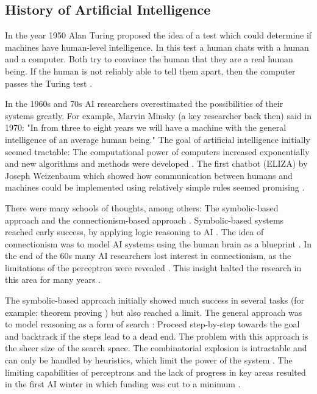 \documentclass[draft,final,oneside]{vutinfth} %
\begin{document}
\subsection{History of Artificial Intelligence}

In the year 1950 Alan Turing proposed the idea of a test which could determine if machines have human-level intelligence. In this test a human chats with a human and a computer. Both try to convince the human that they are a real human being. If the human is not reliably able to tell them apart, then the computer passes the Turing test \cite{turingtest}.

In the 1960s and 70s AI researchers overestimated the possibilities of their systems greatly. For example, Marvin Minsky (a key researcher back then) said in 1970: "In from three to eight years we will have a machine with the general intelligence of an average human being." The goal of artificial intelligence initially seemed tractable:
The computational power of computers increased exponentially and new algorithms and methods were developed \cite{mooreslaw}\cite{questforai}. The first chatbot (ELIZA) by Joseph Weizenbaum which showed how communication between humans and machines could be implemented using relatively simple rules seemed promising \cite{weizenbaum1966eliza}.

There were many schools of thoughts, among others: The symbolic-based approach and the connectionism-based approach \cite{machineswhothink}. Symbolic-based systems reached early success, by applying logic reasoning to AI \cite{machineswhothink}. The idea of connectionism was to model AI systems using the human brain as a blueprint \cite{machineswhothink}. In the end of the 60s many AI researchers lost interest in connectionism, as the limitations of the perceptron were revealed \cite{Minsky1969PerceptronsA}. This insight halted the research in this area for many years \cite{questforai}.

The symbolic-based approach initially showed much success in several tasks (for example: theorem proving \cite{aimodern}) but also reached a limit. The general approach was to model reasoning as a form of search \cite{aimodern}: Proceed step-by-step towards the goal and backtrack if the steps lead to a dead end. The problem with this approach is the sheer size of the search space. The combinatorial explosion is intractable and can only be handled by heuristics, which limit the power of the system \cite{aimodern}. The limiting capabilities of perceptrons and the lack of progress in key areas resulted in the first AI winter in which funding was cut to a minimum \cite{crevier}.
\end{document}
